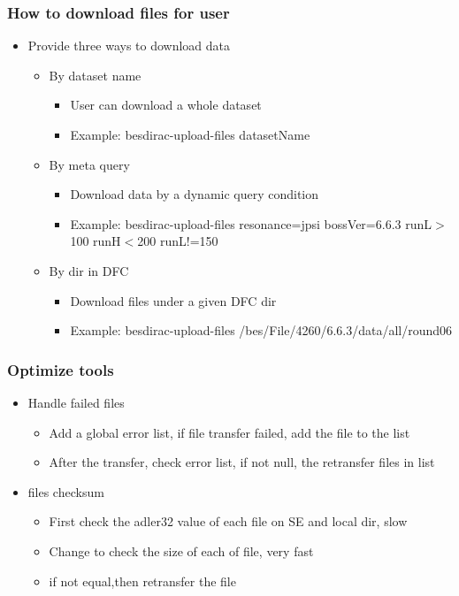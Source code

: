 \documentclass{beamer}
\begin{document}
\begin{frame}
  \frametitle{How to download files for user}
  \begin{itemize}
    \item Provide three ways to download data 
      \begin{itemize}
          \item By dataset name
            \begin{itemize}
                \item User can download a whole dataset
                \item Example: besdirac-upload-files datasetName
            \end{itemize}
          \item By meta query 
            \begin{itemize}
                \item Download data by a dynamic query condition
                \item Example: besdirac-upload-files resonance=jpsi bossVer=6.6.3 runL$>$100 runH$<$200 runL!=150
            \end{itemize}
          \item By dir in DFC
            \begin{itemize}
                \item Download files under a given DFC dir
                \item Example: besdirac-upload-files /bes/File/4260/6.6.3/data/all/round06 
            \end{itemize}
      \end{itemize}
  \end{itemize}
\end{frame}

\begin{frame}
  \frametitle{Optimize tools}
  \begin{itemize}
    \item Handle failed files 
      \begin{itemize}
          \item Add a global error list, if file transfer failed, add the file to the list
          \item After the transfer, check error list, if not null, the retransfer files in list 
      \end{itemize}
    \item files checksum 
      \begin{itemize}
          \item First check the adler32 value of each file on SE and local dir, slow
          \item Change to check the size of each of file, very fast
          \item if not equal,then retransfer the file
      \end{itemize}
  \end{itemize}
\end{frame}
\end{document}
